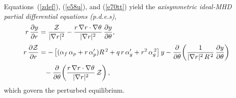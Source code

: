 \documentclass[12pt,prb,aps]{revtex4-1}
\begin{document}
Equations~(\ref{zdef}), (\ref{e58u}), and   (\ref{e70tt}) yield the {\em axisymmetric ideal-MHD partial differential equations (p.d.e.s)},
\begin{align}\label{e63y}
r\,\frac{\partial y}{\partial r} &= \frac{{\cal Z}}{|\nabla r|^2} - \frac{r\,\nabla r\cdot\nabla\theta}{|\nabla r|^2}\,\frac{\partial y}{\partial\theta},\\[0.5ex]
r\,\frac{\partial {\cal Z}}{\partial r}&= -\left[(\alpha_f\,\alpha_p+ r\,\alpha_p')R^{\,2} + q\,r\,\alpha_g'+r^2\,\alpha_g^{\,2}\right]y-\frac{\partial}{\partial\theta}\!\left(\frac{1}{|\nabla r|^2\,R^{\,2}}\,\frac{\partial y}{\partial\theta}\right)\nonumber\\[0.5ex]
&\phantom{=} -\frac{\partial}{\partial\theta}\!\left(\frac{r\,\nabla r\cdot\nabla\theta}{|\nabla r|^2}\,{\cal Z}\right),\label{e64y}
\end{align}
which govern the perturbed equilibrium. 
\end{document}
